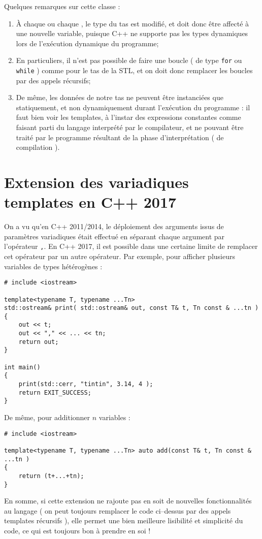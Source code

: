 \documentclass[a4]{article}
\begin{document}
Quelques remarques sur cette classe :
\begin{enumerate}
\item À chaque \verb@pop@ ou chaque \verb@push@, le type du tas est modifié, et doit donc être affecté à une nouvelle variable, puisque
C++ ne supporte pas les types dynamiques lors de l'exécution dynamique du programme;
\item En particuliers, il n'est pas possible de faire une boucle ( de type \verb$for$ ou \verb$while$ ) comme pour le tas de la STL,
et on doit donc remplacer les boucles par des appels récursifs;
\item De même, les données de notre tas ne peuvent être instanciées que statiquement, et non dynamiquement durant l'exécution du programme :
il faut bien voir les templates, à l'instar des expressions constantes comme faisant parti du langage interprété par le compilateur, et ne
pouvant être traité par le programme résultant de la phase d'interprétation ( de compilation ). 
\end{enumerate}

\section{Extension des variadiques templates en C++ 2017}

On a vu qu'en C++ 2011/2014, le déploiement des arguments issus de paramètres variadiques était effectué en séparant chaque argument
par l'opérateur \verb$,$. En C++ 2017, il est possible dans une certaine limite de remplacer cet opérateur par un autre opérateur.
Par exemple, pour afficher plusieurs variables de types hétérogènes :
\begin{lstlisting}
# include <iostream>

template<typename T, typename ...Tn>
std::ostream& print( std::ostream& out, const T& t, Tn const & ...tn )
{
    out << t;
    out << "," << ... << tn;
    return out;
}

int main()
{
    print(std::cerr, "tintin", 3.14, 4 );
    return EXIT_SUCCESS;
}
\end{lstlisting}

De même, pour additionner $n$ variables :
\begin{lstlisting}
# include <iostream>

template<typename T, typename ...Tn> auto add(const T& t, Tn const & ...tn )
{
    return (t+...+tn);
}    
\end{lstlisting}

En somme, si cette extension ne rajoute pas en soit de nouvelles fonctionnalités au langage ( on peut toujours remplacer le code ci--dessus par des appels templates récursifs ), elle permet une bien meilleure lisibilité et simplicité du code, ce qui est
toujours bon à prendre en soi !
\end{document}
